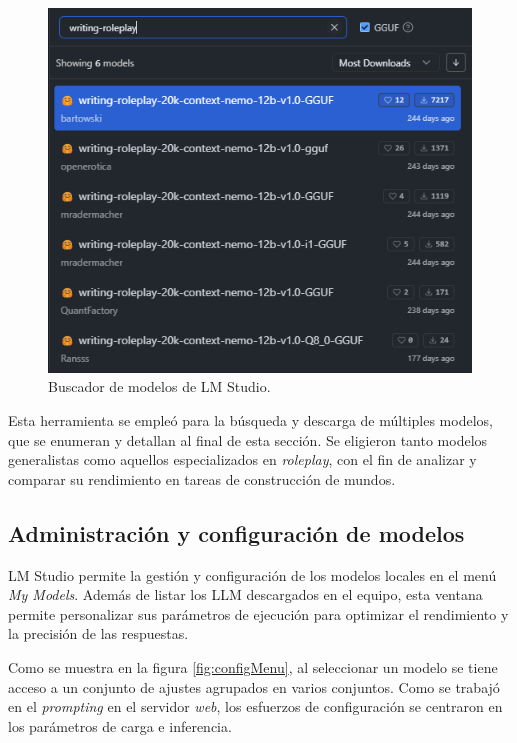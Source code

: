\begin{figure}[htbp]
	\centering
	\includegraphics[width=0.8 \textwidth]{./Figures/download_menu.png}
	\caption{Buscador de modelos de LM Studio.}
	\label{fig:downloadMenu}
\end{figure}

Esta herramienta se empleó para la búsqueda y descarga de múltiples modelos,
que se enumeran y detallan al final de esta sección.
Se eligieron tanto modelos generalistas como aquellos especializados en \textit{roleplay},
con el fin de analizar y comparar su rendimiento en tareas de construcción de mundos.

\subsection{Administración y configuración de modelos}
LM Studio permite la gestión y configuración de los modelos locales en el menú \textit{My Models}.
Además de listar los LLM descargados en el equipo, esta ventana permite personalizar
sus parámetros de ejecución para optimizar el rendimiento y la precisión de las respuestas.

\pagebreak
Como se muestra en la figura \ref{fig:configMenu},
al seleccionar un modelo se tiene acceso a un conjunto de ajustes agrupados
en varios conjuntos.
Como se trabajó en el \textit{prompting} en el servidor \textit{web},
los esfuerzos de configuración se centraron en los parámetros de carga e inferencia.

